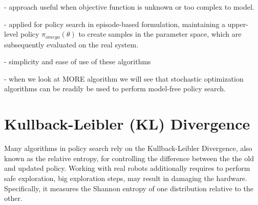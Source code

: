 - approach useful when objective function is unknown or too complex to model.

- applied for policy search in episode-based formulation, maintaining a upper-level policy
$\pi_{omega}(\theta)$ to create samples in the parameter space, which are
subsequently evaluated on the real system.

- simplicity and ease of use of these algorithms

- when we look at MORE algorithm we will see that stochastic optimization algorithms can
be readily be used to perform model-free policy search.
  
%
%
%
%
%
%

\section{Kullback-Leibler (KL) Divergence}
Many algorithms in policy search rely on the Kullback-Leibler Divergence, also
known as the relative entropy, for controlling
the difference between the the old and updated policy.
Working with real robots additionally requires to perform safe exploration, big
exploration steps, may result in damaging the hardware.
Specifically, it measures the Shannon entropy of one distribution relative to the
other.

